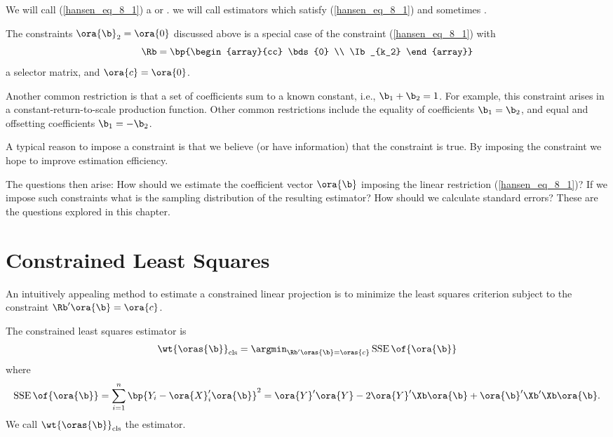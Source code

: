 We will call (\ref{hansen_eq_8_1}) a  or . we will call estimators which satisfy (\ref{hansen_eq_8_1})  and sometimes .

The constraints $\ora{\b}_2 = \ora{0}$ discussed above is a special case of the constraint (\ref{hansen_eq_8_1}) with 
\begin{equation}
    \label{hansen_eq_8_2}
    \Rb = \bp{\begin{array}{cc}
        \bds{0} \\
        \Ib_{k_2}
    \end{array}}
\end{equation}
a selector matrix, and $\ora{c} = \ora{0}$.

Another common restriction is that a set of coefficients sum to a known constant, i.e., $\b_1 + \b_2 =1$. For example, this constraint arises in a constant-return-to-scale production function. Other common restrictions include the equality of coefficients $\b_1 = \b_2$, and equal and offsetting coefficients $\b_1 = -\b_2$.

A typical reason to impose a constraint is that we believe (or have information) that the constraint is true. By imposing the constraint we hope to improve estimation efficiency. 

The questions then arise: How should we estimate the coefficient vector $\ora{\b}$ imposing the linear restriction (\ref{hansen_eq_8_1})? If we impose such constraints what is the sampling distribution of the resulting estimator? How should we calculate standard errors? These are the questions explored in this chapter.


\section{Constrained Least Squares}

An intuitively appealing method to estimate a constrained linear projection is to minimize the least squares criterion subject to the constraint $\Rb^{\prime} \ora{\b} = \ora{c}$.

The constrained least squares estimator is
\begin{equation}
    \label{hansen_eq_8_3}
    \wt{\oras{\b}}_{\text{cls}} = \argmin_{\Rb^\prime \oras{\b} = \oras{c}} \operatorname*{SSE}\of{\ora{\b}}
\end{equation}
where 
\begin{equation}
    \label{hansen_eq_8_4}
    \operatorname*{SSE}\of{\ora{\b}} = \sum_{i=1}^{n} \bp{Y_i - \ora{X}_i^\prime \ora{\b}}^2 = \ora{Y}^\prime \ora{Y} - 2 \ora{Y}^\prime \Xb \ora{\b} + \ora{\b}^\prime \Xb^\prime \Xb \ora{\b}.
\end{equation}
We call $\wt{\oras{\b}}_{\text{cls}}$ the  estimator.

